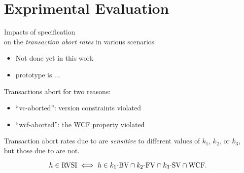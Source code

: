 \section{Exprimental Evaluation}

\begin{frame}{}
  \begin{center}
    Impacts of \rvsi{} specification \\[5pt]
    on the \emph{transaction abort rates} in various scenarios
  \end{center}

  \pause
  \vspace{0.50cm}
  \centerline{}
  \begin{itemize}
    \item Not done yet in this work
    \item \chameleon{} prototype is $\ldots$
  \end{itemize}
\end{frame}

\begin{frame}{}
  Transactions abort for two reasons:
  \begin{itemize}
    \item ``vc-aborted'': \rvsi{} version constraints violated
    \item ``wcf-aborted'': the WCF property violated
  \end{itemize}

  \pause
  \vspace{0.60cm}
  Transaction abort rates due to  are \emph{sensitive} to different values of $k_1$, $k_2$, or $k_3$,
  \pause
  but those due to  are not.

  \pause
  \vspace{0.50cm}
  \[
    h \in \text{RVSI}{} \iff h \in k_1\text{-BV}{} \cap k_2\text{-FV}{} \cap k_3\text{-SV}{} \cap \text{WCF}{}.
  \]
\end{frame}

